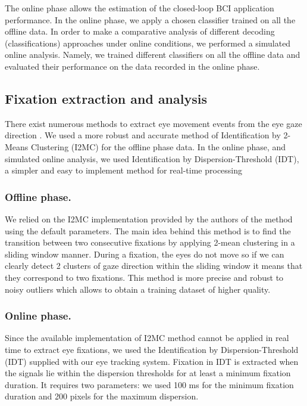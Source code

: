 \documentclass[12pt]{iopart}
\begin{document}
The online phase allows the estimation of the closed-loop BCI application performance. In the online phase, we apply a chosen classifier trained on all the offline data. In order to make a comparative analysis of different decoding (classifications) approaches under online conditions, we performed a simulated online analysis. Namely, we trained different classifiers on all the offline data and evaluated their performance on the data recorded in the online phase. 

\subsection{Fixation extraction and analysis}
There exist numerous methods to extract eye movement events
from the eye gaze direction \cite{zhang_novel_2015,pena_detecting_2019}.
We used a more robust and accurate method of 
Identification by 2-Means Clustering (I2MC)
\cite{hessels_noise-robust_2017}
for the offline phase data.
In the online phase, and simulated online analysis,
we used Identification by Dispersion-Threshold (IDT), a simpler and
easy to implement method for real-time processing \cite{salvucci_identifying_2000}


\subsubsection*{Offline phase.}
We relied on the I2MC implementation provided by the authors of the method
using the default parameters.
The main idea behind this method is to find the transition between two consecutive fixations
by applying 2-mean clustering in a sliding window manner.
During a fixation, the eyes do not move so if we can clearly detect
2 clusters of gaze direction within the sliding window
it means that they correspond to two fixations.
This method is more precise and robust to noisy outliers which
allows to obtain a training dataset of higher quality.

\subsubsection*{Online phase.}
Since the available implementation of I2MC method cannot be applied 
in real time to extract eye fixations,
we used the Identification by Dispersion-Threshold (IDT) 
supplied with our eye tracking system. Fixation in IDT is extracted
when the signals lie within the dispersion thresholds for at least a minimum fixation duration.
It requires two parameters: we used 100 ms for the minimum fixation duration
and 200 pixels for the maximum dispersion.
\end{document}

